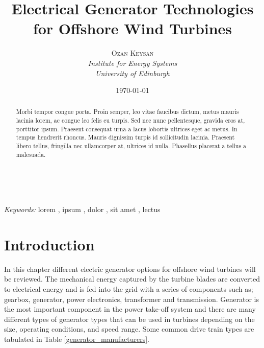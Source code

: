 \documentclass[a4paper, 11pt]{article} %
\title{\textbf{Electrical Generator Technologies for Offshore Wind Turbines}} %
\author{\textsc{Ozan Keysan} %
\\{\textit{Institute for Energy  Systems\\ University of Edinburgh}}} %
\date{\today} %
\makeatletter
\renewcommand{\maketitle}{ %
\begin{flushright} %
{\LARGE\@title} %

\vspace{50pt} %

{\large\@author} %
\\\@date %

\vspace{40pt} %
\end{flushright}
}
\makeatother
\begin{document}
\maketitle %



\begin{abstract}
Morbi tempor congue porta. Proin semper, leo vitae faucibus dictum, metus mauris lacinia lorem, ac congue leo felis eu turpis. Sed nec nunc pellentesque, gravida eros at, porttitor ipsum. Praesent consequat urna a lacus lobortis ultrices eget ac metus. In tempus hendrerit rhoncus. Mauris dignissim turpis id sollicitudin lacinia. Praesent libero tellus, fringilla nec ullamcorper at, ultrices id nulla. Phasellus placerat a tellus a malesuada.
\end{abstract}

\hspace*{3,6mm}\textit{Keywords:} lorem , ipsum , dolor , sit amet , lectus %

\vspace{30pt} %


\section*{Introduction}

In this chapter different electric generator options for offshore wind turbines will be reviewed. The mechanical energy captured by the turbine blades are converted to electrical energy and is fed into the grid with a series of components such as; gearbox, generator, power electronics, transformer and transmission. Generator is the most important component in the power take-off system and there are many different types of generator types that can be used in turbines depending on the size, operating conditions, and speed range. Some common drive train types are tabulated in Table \ref{generator_manufacturers}.
\end{document}
